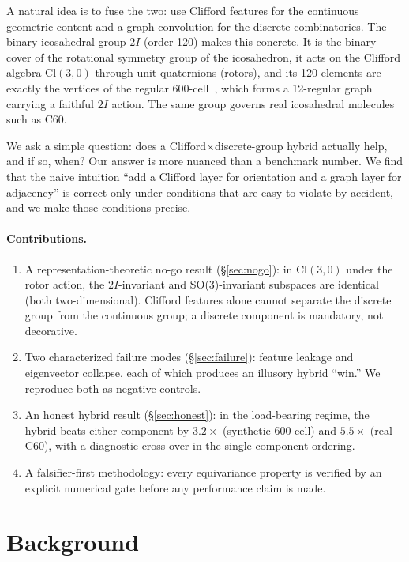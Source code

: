 \documentclass[10pt]{article}
\begin{document}
A natural idea is to fuse the two: use Clifford features for the continuous geometric content and a graph convolution for the discrete combinatorics.
The binary icosahedral group $2I$ (order 120) makes this concrete.
It is the binary cover of the rotational symmetry group of the icosahedron, it acts on the Clifford algebra $\mathrm{Cl}(3,0)$ through unit quaternions (rotors), and its 120 elements are exactly the vertices of the regular 600-cell~\cite{coxeter1973}, which forms a 12-regular graph carrying a faithful $2I$ action.
The same group governs real icosahedral molecules such as C60.

We ask a simple question: does a Clifford$\times$discrete-group hybrid actually help, and if so, when?
Our answer is more nuanced than a benchmark number.
We find that the naive intuition ``add a Clifford layer for orientation and a graph layer for adjacency'' is correct only under conditions that are easy to violate by accident, and we make those conditions precise.

\paragraph{Contributions.}
\begin{enumerate}
  \item A representation-theoretic no-go result (\S\ref{sec:nogo}): in $\mathrm{Cl}(3,0)$ under the rotor action, the $2I$-invariant and SO(3)-invariant subspaces are identical (both two-dimensional). Clifford features alone cannot separate the discrete group from the continuous group; a discrete component is mandatory, not decorative.
  \item Two characterized failure modes (\S\ref{sec:failure}): feature leakage and eigenvector collapse, each of which produces an illusory hybrid ``win.'' We reproduce both as negative controls.
  \item An honest hybrid result (\S\ref{sec:honest}): in the load-bearing regime, the hybrid beats either component by $3.2\times$ (synthetic 600-cell) and $5.5\times$ (real C60), with a diagnostic cross-over in the single-component ordering.
  \item A falsifier-first methodology: every equivariance property is verified by an explicit numerical gate before any performance claim is made.
\end{enumerate}

\section{Background}
\end{document}
